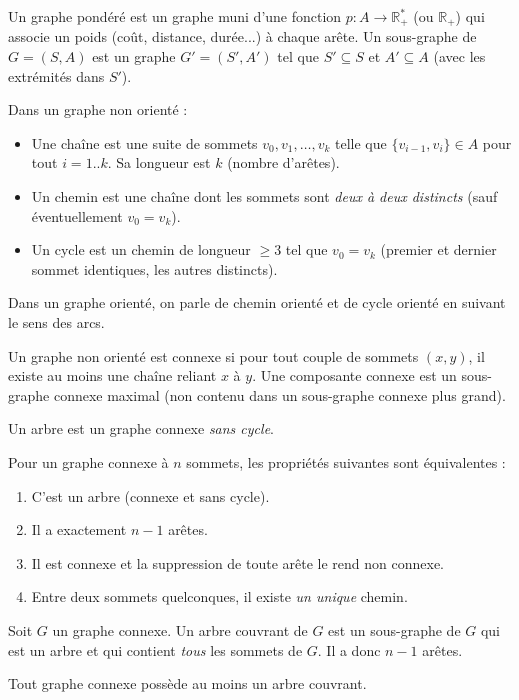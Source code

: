 \documentclass[11pt]{article}
\newcommand{\cle}[1]{{\popxbold\color{popdark}#1}}
\begin{document}
\begin{definition}
Un \cle{graphe pondéré} est un graphe muni d'une fonction $p : A \to \mathbb{R}_+^*$ (ou $\mathbb{R}_+$) qui associe un \cle{poids} (coût, distance, durée...) à chaque arête.
Un \cle{sous-graphe} de $G=(S,A)$ est un graphe $G'=(S',A')$ tel que $S'\subseteq S$ et $A'\subseteq A$ (avec les extrémités dans $S'$).
\end{definition}

\begin{definition}
Dans un graphe non orienté :
\begin{itemize}
\item Une \cle{chaîne} est une suite de sommets $v_0, v_1, \dots, v_k$ telle que $\{v_{i-1}, v_i\} \in A$ pour tout $i=1..k$. Sa \cle{longueur} est $k$ (nombre d'arêtes).
\item Un \cle{chemin} est une chaîne dont les sommets sont \emph{deux à deux distincts} (sauf éventuellement $v_0=v_k$).
\item Un \cle{cycle} est un chemin de longueur $\ge 3$ tel que $v_0 = v_k$ (premier et dernier sommet identiques, les autres distincts).
\end{itemize}
Dans un graphe orienté, on parle de \cle{chemin orienté} et de \cle{cycle orienté} en suivant le sens des arcs.
\end{definition}

\begin{definition}
Un graphe non orienté est \cle{connexe} si pour tout couple de sommets $(x,y)$, il existe au moins une chaîne reliant $x$ à $y$.
Une \cle{composante connexe} est un sous-graphe connexe maximal (non contenu dans un sous-graphe connexe plus grand).
\end{definition}

\begin{definition}
Un \cle{arbre} est un graphe connexe \emph{sans cycle}.
\begin{propriete}
Pour un graphe connexe à $n$ sommets, les propriétés suivantes sont équivalentes :
\begin{enumerate}
\item C'est un arbre (connexe et sans cycle).
\item Il a exactement $n-1$ arêtes.
\item Il est connexe et la suppression de toute arête le rend non connexe.
\item Entre deux sommets quelconques, il existe \emph{un unique} chemin.
\end{enumerate}
\end{propriete}
Soit $G$ un graphe connexe. Un \cle{arbre couvrant} de $G$ est un sous-graphe de $G$ qui est un arbre et qui contient \emph{tous} les sommets de $G$. Il a donc $n-1$ arêtes.
\begin{propriete}[Existence]
Tout graphe connexe possède au moins un arbre couvrant.
\end{propriete}
\end{definition}
\end{document}
